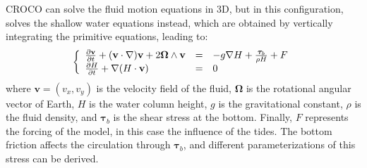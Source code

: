 \documentclass[../../Main_ManuscritThese.tex]{subfiles}
\newcommand{\CROCO}{CROCO}
\begin{document}
\CROCO{} can solve the fluid motion equations in 3D, but in this
configuration, solves the shallow water equations instead, which are
obtained by vertically integrating the primitive equations, leading
to:
\begin{align}
  \left\{
  \begin{array}{lll}
    \frac{\partial \mathbf{v}}{\partial t} + (\mathbf{v} \cdot \nabla )\mathbf{v} + 2 \bm{\Omega} \wedge \mathbf{v} & = & -g\nabla H + \frac{\bm{\tau}_b}{\rho H} + F \\
    \frac{\partial H}{\partial t} + \nabla (H \cdot \mathbf{v})                                                     & = & 0
  \end{array}
                                                   \right.
\end{align}
where $\mathbf{v} = (v_x,v_y)$ is the velocity field of the fluid,
$\bm{\Omega}$ is the rotational angular vector of Earth, $H$ is the
water column height, $g$ is the gravitational constant, $\rho$ is the
fluid density, and $\bm{\tau}_b$ is the shear stress at the
bottom. Finally, $F$ represents the forcing of the model, in this case
the influence of the tides.  The bottom friction affects the
circulation through $\bm{\tau}_b$, and different parameterizations of
this stress can be derived.
\end{document}
